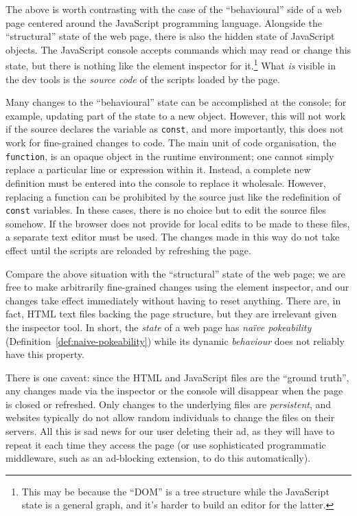 The above is worth contrasting with the case of the ``behavioural'' side
of a web page centered around the JavaScript programming language.
Alongside the ``structural'' state of the web page, there is also the
hidden state of JavaScript objects. The JavaScript console accepts
commands which may read or change this state, but there is nothing like
the element inspector for it.\footnote{This may be because the ``DOM''
  is a tree structure while the JavaScript state is a general graph, and
  it's harder to build an editor for the latter.} What \emph{is} visible
in the dev tools is the \emph{source code} of the scripts loaded by the
page.

Many changes to the ``behavioural'' state can be accomplished at the
console; for example, updating part of the state to a new object.
However, this will not work if the source declares the variable as
\texttt{const}, and more importantly, this does not work for
fine-grained changes to code. The main unit of code organisation, the
\texttt{function}, is an opaque object in the runtime environment; one
cannot simply replace a particular line or expression within it.
Instead, a complete new definition must be entered into the console to
replace it wholesale. However, replacing a function can be prohibited by
the source just like the redefinition of \texttt{const} variables. In
these cases, there is no choice but to edit the source files somehow. If
the browser does not provide for local edits to be made to these files,
a separate text editor must be used. The changes made in this way do not
take effect until the scripts are reloaded by refreshing the page.

Compare the above situation with the ``structural'' state of the web
page; we are free to make arbitrarily fine-grained changes using the
element inspector, and our changes take effect immediately without
having to reset anything. There are, in fact, HTML text files backing
the page structure, but they are irrelevant given the inspector tool. In
short, the \emph{state} of a web page has \emph{naïve pokeability}
(Definition~\ref{def:naive-pokeability}) while its dynamic
\emph{behaviour} does not reliably have this property.

There is one caveat: since the HTML and JavaScript files are the
``ground truth'', any changes made via the inspector or the console will
disappear when the page is closed or refreshed. Only changes to the
underlying files are \emph{persistent}, and websites typically do not
allow random individuals to change the files on their servers. All this
is sad news for our user deleting their ad, as they will have to repeat
it each time they access the page (or use sophisticated programmatic
middleware, such as an ad-blocking extension, to do this automatically).


